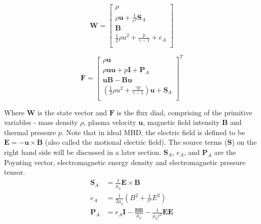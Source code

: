 \begin{equation}
    \mathbf{W} = \left[ \begin{array}{c}
    \rho\\
    \rho \mathbf{u} + \frac{1}{c^2}\mathbf{S}_A\\ 
    \mathbf{B}     \\
    \frac{1}{2}\rho u^2 + \frac{p}{\gamma - 1} + e_A\\
    \end{array} \right]
\end{equation}


\begin{equation}
    \mathbf{F} = \left[ \begin{array}{c}
    \rho \mathbf{u}\\
    \rho \mathbf{u} \mathbf{u} + p\mathbf{I} + \mathbf{P}_A\\ 
    \mathbf{u}\mathbf{B} - \mathbf{B}\mathbf{u}\\
    \left(\frac{1}{2}\rho u^2 + \frac{\gamma p}{\gamma - 1}\right)\mathbf{u} + \mathbf{S}_A\\
    \end{array} \right]^T
\end{equation}

Where $\mathbf{W}$ is the state vector and $\mathbf{F}$ is the flux diad, comprising of the primitive variables - mass density $\rho$, plasma velocity $\mathbf{u}$, magnetic field intensity $\mathbf{B}$ and thermal pressure $p$. Note that in ideal MHD, the electric field is defined to be $\mathbf{E} = -\mathbf{u} \times \mathbf{B}$ (also called the motional electric field). The source terms ($\mathbf{S}$) on the right hand side will be discussed in a later section. $\mathbf{S}_A$, $e_A$, and $\mathbf{P}_A$ are the Poynting vector, electromagnetic energy density and electromagnetic pressure tensor.
\begin{align}
    \mathbf{S}_A & = \frac{1}{\mu_0} \mathbf{E} \times \mathbf{B}\\
    e_A &= \frac{1}{2\mu_0} \left( B^2 + \frac{1}{c^2} E^2\right)\\
    \mathbf{P}_A &= e_A \mathbf{I} - \frac{\mathbf{B}\mathbf{B}}{\mu_0} - \frac{1}{\mu_0 c^2}\mathbf{E}\mathbf{E}
\end{align}

